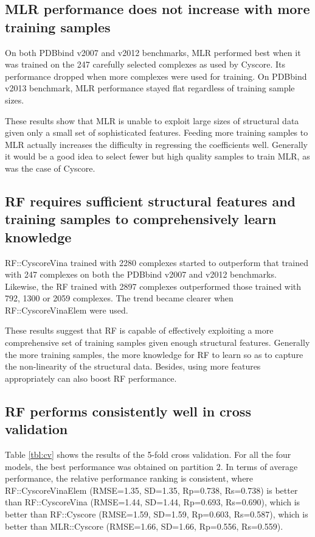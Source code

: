 \documentclass[journal=jacsat,manuscript=article]{achemso}
\begin{document}
\subsection{MLR performance does not increase with more training samples}

On both PDBbind v2007 and v2012 benchmarks, MLR performed best when it was trained on the 247 carefully selected complexes as used by Cyscore. Its performance dropped when more complexes were used for training. On PDBbind v2013 benchmark, MLR performance stayed flat regardless of training sample sizes.

These results show that MLR is unable to exploit large sizes of structural data given only a small set of sophisticated features. Feeding more training samples to MLR actually increases the difficulty in regressing the coefficients well. Generally it would be a good idea to select fewer but high quality samples to train MLR, as was the case of Cyscore.

\subsection{RF requires sufficient structural features and training samples to comprehensively learn knowledge}

RF::CyscoreVina trained with 2280 complexes started to outperform that trained with 247 complexes on both the PDBbind v2007 and v2012 benchmarks. Likewise, the RF trained with 2897 complexes outperformed those trained with 792, 1300 or 2059 complexes. The trend became clearer when RF::CyscoreVinaElem were used.

These results suggest that RF is capable of effectively exploiting a more comprehensive set of training samples given enough structural features. Generally the more training samples, the more knowledge for RF to learn so as to capture the non-linearity of the structural data. Besides, using more features appropriately can also boost RF performance.

\subsection{RF performs consistently well in cross validation}

Table \ref{tbl:cv} shows the results of the 5-fold cross validation. For all the four models, the best performance was obtained on partition 2. In terms of average performance, the relative performance ranking is consistent, where RF::CyscoreVinaElem (RMSE=1.35, SD=1.35, Rp=0.738, Rs=0.738) is better than RF::CyscoreVina (RMSE=1.44, SD=1.44, Rp=0.693, Rs=0.690), which is better than RF::Cyscore (RMSE=1.59, SD=1.59, Rp=0.603, Rs=0.587), which is better than MLR::Cyscore (RMSE=1.66, SD=1.66, Rp=0.556, Rs=0.559).
\end{document}
